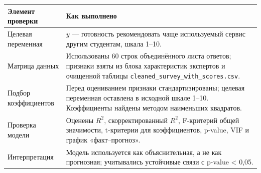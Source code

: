 {\small
\setlength{\tabcolsep}{3.0pt}
\renewcommand{\arraystretch}{1.18}
\begin{tabular}{L{4.6cm}L{9.0cm}}
\toprule
Элемент проверки & Как выполнено \\
\midrule
Целевая переменная & $y$ — готовность рекомендовать чаще используемый сервис другим студентам, шкала 1--10. \\
Матрица данных & Использованы 60 строк объединённого листа ответов; признаки взяты из блока характеристик экспертов и очищенной таблицы \texttt{cleaned\_survey\_with\_scores.csv}. \\
Подбор коэффициентов & Перед оцениванием признаки стандартизированы; целевая переменная оставлена в исходной шкале 1--10. Коэффициенты найдены методом наименьших квадратов. \\
Проверка модели & Оценены $R^2$, скорректированный $R^2$, F-критерий общей значимости, t-критерии для коэффициентов, p-value, VIF и график «факт--прогноз». \\
Интерпретация & Модель используется как объяснительная, а не как прогнозная; учитывались устойчивые связи с p-value < 0{,}05. \\
\bottomrule
\end{tabular}}